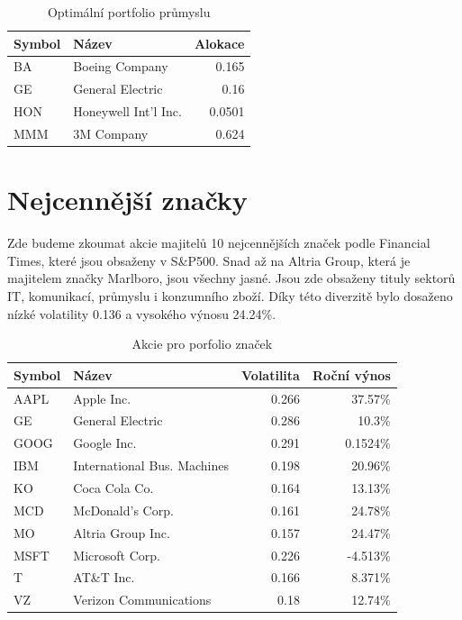 \documentclass[a4paper,12pt]{report}
\begin{document}
    \begin{table}[htb]
      \centering
      \begin{tabular}{|l|l|r|}
        \hline
        Symbol&Název&Alokace\\\hline\hline
        BA&Boeing Company &0.165\\\hline
        GE&General Electric &0.16\\\hline
        HON&Honeywell Int'l Inc. &0.0501\\\hline
        MMM&3M Company &0.624\\\hline
      \end{tabular}
      \caption{Optimální portfolio průmyslu}
    \end{table}
    
  \clearpage
  \section{Nejcennější značky}
    Zde budeme zkoumat akcie majitelů 10 nejcennějších značek podle Financial Times\cite{ft}, které jsou obsaženy v S\&P500. Snad až na Altria Group, která je majitelem značky Marlboro, jsou všechny jasné. Jsou zde obsaženy tituly sektorů IT, komunikací, průmyslu i konzumního zboží. Díky této diverzitě bylo dosaženo nízké volatility 0.136 a vysokého výnosu 24.24\%.   
    \begin{table}[htb]
      \centering
      \begin{tabular}{|l|l|r|r|}
        \hline
        Symbol&Název&Volatilita&Roční výnos\\\hline\hline
        AAPL&Apple Inc. &0.266&37.57\%\\\hline
        GE&General Electric &0.286&10.3\%\\\hline
        GOOG&Google Inc. &0.291&0.1524\%\\\hline
        IBM&International Bus. Machines &0.198&20.96\%\\\hline
        KO&Coca Cola Co. &0.164&13.13\%\\\hline
        MCD&McDonald's Corp. &0.161&24.78\%\\\hline
        MO&Altria Group Inc. &0.157&24.47\%\\\hline
        MSFT&Microsoft Corp. &0.226&-4.513\%\\\hline
        T&AT\&T Inc. &0.166&8.371\%\\\hline
        VZ&Verizon Communications &0.18&12.74\%\\\hline
      \end{tabular}
      \caption{Akcie pro porfolio značek}
    \end{table}
\end{document}
